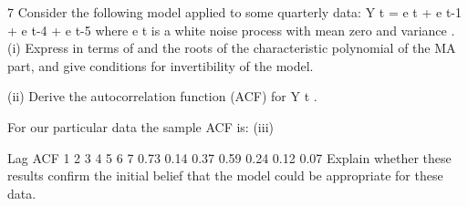 \documentclass[a4paper,12pt]{article}
\begin{document}
7
Consider the following model applied to some quarterly data:
Y t = e t +  e t-1 +  e t-4 +   e t-5
where e t is a white noise process with mean zero and variance  .
(i) Express in terms of  and  the roots of the characteristic polynomial of the
MA part, and give conditions for invertibility of the model.

(ii) Derive the autocorrelation function (ACF) for Y t .

For our particular data the sample ACF is:
(iii)



Lag ACF
1
2
3
4
5
6
7 0.73
0.14
0.37
0.59
0.24
0.12
0.07
Explain whether these results confirm the initial belief that the model could be
appropriate for these data.

\end{document}
